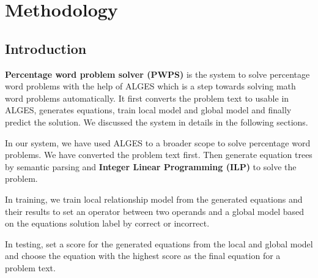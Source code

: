 \documentclass[document.tex]{subfiles}
\begin{document}
\chapter{Methodology}

\section{Introduction}
\noindent \textbf{Percentage word problem solver (PWPS)} is the system to solve percentage word problems with the help of ALGES which is a step towards solving math word problems automatically. It first converts the problem text to usable in ALGES, generates equations, train local model and global model and finally predict the solution. We discussed the system in details in the following sections.

In our system, we have used ALGES to a broader scope to solve percentage word problems. We have converted the problem text first. Then generate equation trees by semantic parsing and \textbf{Integer Linear Programming (ILP)} to solve the problem. 

In training, we train local relationship model from the generated equations and their results to set an operator between two operands and a global model based on the equations solution label by correct or incorrect. 

In testing, set a score for the generated equations from the local and global model and choose the equation with the highest score as the final equation for a problem text.
\end{document}
